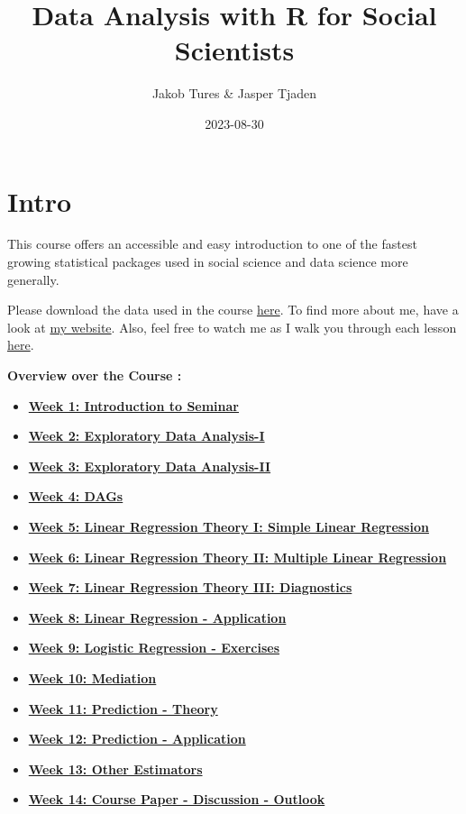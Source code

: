 \documentclass[
]{book}
\title{Data Analysis with R for Social Scientists}
\author{Jakob Tures \& Jasper Tjaden}
\date{2023-08-30}
\providecommand{\tightlist}{%
  \setlength{\itemsep}{0pt}\setlength{\parskip}{0pt}}
\begin{document}
\maketitle

{
\setcounter{tocdepth}{1}
\tableofcontents
}
\hypertarget{intro}{%
\chapter*{Intro}\label{intro}}

This course offers an accessible and easy introduction to one of the fastest growing statistical packages used in social science and data science more generally.

Please download the data used in the course \href{https://www.worldvaluessurvey.org/WVSDocumentationWV7.jsp}{here}. To find more about me, have a look at \href{https://jaspertjaden.com}{my website}. Also, feel free to watch me as I walk you through each lesson \href{https://www.youtube.com/playlist?list=PLr43hk2e3hFMg4tZdJsN0qzG5YkQB3A1c}{here}.

\textbf{Overview over the Course :}

\begin{itemize}
\tightlist
\item
  \textbf{\protect\hyperlink{intro-sem}{Week 1: Introduction to Seminar}}
\item
  \textbf{\protect\hyperlink{eda-1}{Week 2: Exploratory Data Analysis-I}}
\item
  \textbf{\protect\hyperlink{eda-2}{Week 3: Exploratory Data Analysis-II}}
\item
  \textbf{\protect\hyperlink{dags-1}{Week 4: DAGs}}
\item
  \textbf{\protect\hyperlink{lin-t-1}{Week 5: Linear Regression Theory I: Simple Linear Regression}}
\item
  \textbf{\protect\hyperlink{lin-t-2}{Week 6: Linear Regression Theory II: Multiple Linear Regression}}
\item
  \textbf{\protect\hyperlink{lin-t-3}{Week 7: Linear Regression Theory III: Diagnostics}}
\item
  \textbf{\protect\hyperlink{lin-a}{Week 8: Linear Regression - Application}}
\item
  \textbf{\protect\hyperlink{lin-e}{Week 9: Logistic Regression - Exercises}}
\item
  \textbf{\protect\hyperlink{med}{Week 10: Mediation}}
\item
  \textbf{\protect\hyperlink{pm-t}{Week 11: Prediction - Theory}}
\item
  \textbf{\protect\hyperlink{pm-a}{Week 12: Prediction - Application}}
\item
  \textbf{\protect\hyperlink{other-est}{Week 13: Other Estimators}}
\item
  \textbf{\protect\hyperlink{out-look}{Week 14: Course Paper - Discussion - Outlook}}
\end{itemize}
\end{document}
